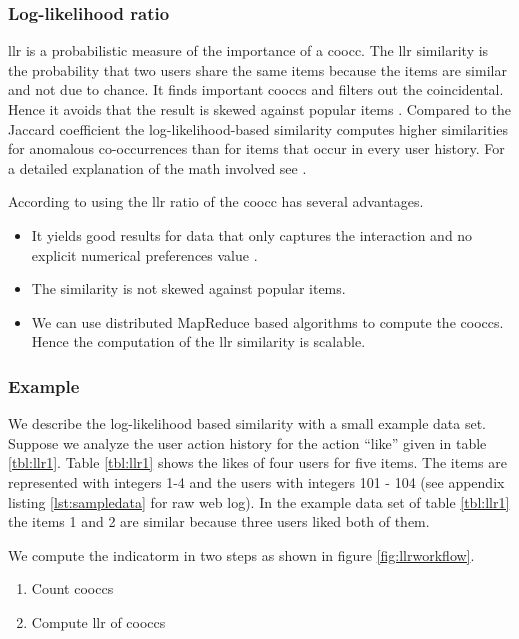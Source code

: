 \subsubsection{Log-likelihood ratio}
\label{sec:llrs}

\Gls{llr} is a probabilistic measure of the importance of a \gls{coocc}. The \gls{llr} similarity  is the probability that two users share the same items because the items are similar and not due to chance. It finds important \glspl{coocc} and filters out the coincidental. Hence it avoids that the result is skewed against popular items \cite{Dunning93}. Compared to the Jaccard coefficient \cite{Hartung} the log-likelihood-based similarity computes higher similarities for anomalous co-occurrences than for items that occur in every user history. For a detailed explanation of the math involved see \cite{Dunning93}. 

According to \cite{Dunning14} using the \gls{llr} ratio of the \gls{coocc} has several advantages.
\begin{itemize}
\item It yields good results for data that only captures the interaction and no explicit numerical \glspl{preference} value \cite{Dunning93}.
\item The similarity is not skewed against popular items.
\item We can use distributed MapReduce based algorithms to compute the \glspl{coocc}. Hence the computation of the \gls{llr} similarity is \gls{scalable}.
\end{itemize}

\subsubsection{Example}
\label{sec:llrexample}

We describe the log-likelihood based similarity with a small example data set. Suppose we analyze the user action history for the action ``like'' given in table \ref{tbl:llr1}. 
Table \ref{tbl:llr1} shows the likes of four users for five items. The items are represented with integers 1-4 and the users with integers 101 - 104  (see appendix listing \ref{lst:sampledata} for raw web log).
In the example data set of table \ref{tbl:llr1} the items 1 and 2 are similar because three users liked both of them.

We compute the \gls{indicatorm} in two steps as shown in figure \ref{fig:llrworkflow}.
\begin{enumerate}
\item Count \glspl{coocc}
\item Compute \gls{llr} of \glspl{coocc}
\end{enumerate}

